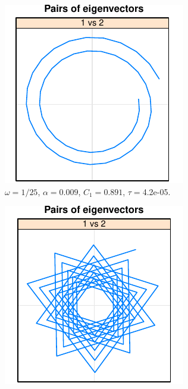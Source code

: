 \documentclass[specialist,
               substylefile = spbu.rtx,
               subf,href,colorlinks=true, 12pt]{disser}
\begin{document}
\begin{figure}[h]
\begin{subfigure}[b]{0.3\textwidth}
    \end{subfigure}
    \begin{subfigure}[b]{0.3\textwidth}
        \includegraphics[width=\textwidth]{re_ex_mod_omega_1_25}
        \caption{ $\omega=1/25$, $\alpha = 0.009$, $C_1 = 0.891$, $\tau =$4.2e-05.}
    \end{subfigure}
    \begin{subfigure}[b]{0.3\textwidth}
        \includegraphics[width=\textwidth]{re_ex_mod_omega_3_10}

\end{subfigure}
\end{figure}
\end{document}
